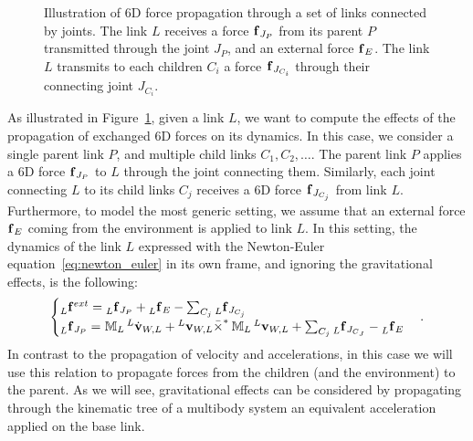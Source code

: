 \begin{figure}
    \centering
    \caption{Illustration of 6D force propagation through a set of links connected by joints. The link $L$ receives a force $\forcesix_{J_P}$ from its parent $P$ transmitted through the joint $J_P$, and an external force $\forcesix_E$. The link $L$ transmits to each children $C_i$ a force $\forcesix_{J_{C_i}}$ through their connecting joint $J_{C_i}$.}
    \label{fig:force_propagation}
\end{figure}

\begin{definition*}
%
As illustrated in Figure~\ref{fig:force_propagation}, given a link $L$, we want to compute the effects of the propagation of exchanged 6D forces on its dynamics.
In this case, we consider a single parent link $P$, and multiple child links $C_1, C_2, \dots$.
The parent link $P$ applies a 6D force $\forcesix_{J_P}$ to $L$ through the joint connecting them.
Similarly, each joint connecting $L$ to its child links $C_j$ receives a 6D force $\forcesix_{J_{C_j}}$ from link $L$.
Furthermore, to model the most generic setting, we assume that an external force $\forcesix_{E}$ coming from the environment is applied to link $L$.
\newline
In this setting, the dynamics of the link $L$ expressed with the Newton-Euler equation~\eqref{eq:newton_euler} in its own frame, and ignoring the gravitational effects, is the following:
%
\begin{equation*}
    \begin{cases}
        \forcesix[L]^{ext} = \forcesix[L]_{J_P} + \forcesix[L]_{E} - \sum_{C_j} \forcesix[L]_{J_{C_j}} \\
        \forcesix[L]_{J_P} = \masssix_L \velsixd[L]_{W,L} + \velsix[L]_{W,L} \bar{\times}^* \masssix_L \velsix[L]_{W,L} + \sum_{C_j} \forcesix[L]_{J_{C_J}} - \forcesix[L]_{E}
    \end{cases}
    .
\end{equation*}
%
In contrast to the propagation of velocity and accelerations, in this case we will use this relation to propagate forces from the children (and the environment) to the parent.
As we will see, gravitational effects can be considered by propagating through the kinematic tree of a multibody system an equivalent acceleration applied on the base link.
%
\end{definition*}

